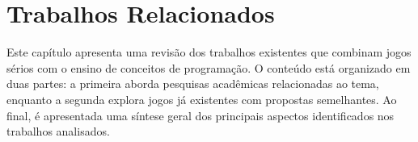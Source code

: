 \chapter{Trabalhos Relacionados}

Este capítulo apresenta uma revisão dos trabalhos existentes que combinam jogos
sérios com o ensino de conceitos de programação. O conteúdo está organizado em duas
partes: a primeira aborda pesquisas acadêmicas relacionadas ao tema, enquanto a
segunda explora jogos já existentes com propostas semelhantes. Ao final, é
apresentada uma síntese geral dos principais aspectos identificados nos
trabalhos analisados.





